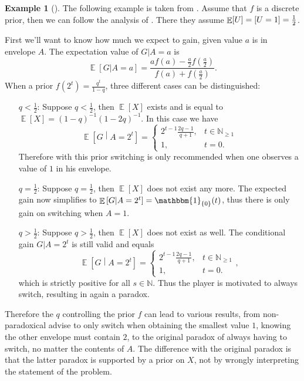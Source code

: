 \documentclass[twoside,a4paper]{article}
\theoremstyle{plain}
\theoremstyle{definition}
\newtheorem{example}[theorem]{Example}
\theoremstyle{remark}
\numberwithin{equation}{section}
\newcommand{\N}{\mathbb{N}}
\let\P\relax
\DeclareMathOperator{\P}{\mathbb{P}}
\DeclareMathOperator{\E}{\mathbb{E}}
\DeclareMathOperator{\1}{\mathbbm{1}}
\begin{document}
\begin{example}[\cite{Navara2017}]
The following example is taken from \cite{Navara2017}. Assume that $f$ is a discrete prior, then we can follow the analysis of \cite{Navara2017}. There they assume $\E[U]=\P[U=1]=\frac{1}{2}$.

First we'll want to know how much we expect to gain, given value $a$ is in envelope $A$. The expectation value of $G|A=a$ is 
\[\E[G|A=a]=\frac{af(a)-\frac{a}{2}f\left(\frac{a}{2}\right)}{f(a)+f\left(\frac{a}{2}\right)}.\]
When a prior $f(2^t)=\frac{q^t}{1-q}$, three different cases can be distinguished:
\begin{enumerate}
	\item[$q<\frac{1}{2}$:] Suppose $q<\frac{1}{2}$, then $\E[X]$ exists and is equal to $\E[X]=(1-q)^{-1}(1-2q)^{-1}$. In this case we have
	\[\E\left[G\middle|A=2^t\right]=\begin{cases}2^{t-1}\frac{2q-1}{q+1},&t\in\N_{\geq 1}\\1,&t=0.\end{cases}\]
	Therefore with this prior switching is only recommended when one observes a value of $1$ in his envelope.
	\item[$q=\frac{1}{2}$:] Suppose $q=\frac{1}{2}$, then $\E[X]$ does not exist any more. The expected gain now simplifies to $\E\left[G\middle|A=2^t\right]=\1_{\{0\}}(t)$, thus there is only gain on switching when $A=1$.
	\item[$q>\frac{1}{2}$:] Suppose $q>\frac{1}{2}$, then $\E[X]$ does not exist as well. The conditional gain $G|A=2^t$ is still valid and equals
	\[\E\left[G\middle|A=2^t\right]=\begin{cases}2^{t-1}\frac{2q-1}{q+1},&t\in\N_{\geq 1}\\1,&t=0.\end{cases},\]
	which is strictly positive for all $s\in\N$. Thus the player is motivated to always switch, resulting in again a paradox.
\end{enumerate}

Therefore the $q$ controlling the prior $f$ can lead to various results, from non-paradoxical advise to only switch when obtaining the smallest value $1$, knowing the other envelope must contain $2$, to the original paradox of always having to switch, no matter the contents of $A$. The difference with the original paradox is that the latter paradox is supported by a prior on $X$, not by wrongly interpreting the statement of the problem.
\end{example}
\end{document}
